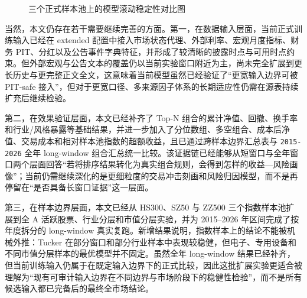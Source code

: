 \begin{figure}[htbp]
\centering
{}
\caption{三个正式样本池上的模型滚动稳定性对比图}
\label{fig:stability}
\end{figure}

当然，本文仍存在若干需要继续完善的方面。第一，在数据输入层面，当前正式训练输入已经在 extended 配置中接入市场状态代理、外部利率、宏观月度指标、财务 PIT、分红以及公告事件字典特征，并形成了较清晰的披露时点与可用时点约束。但外部宏观与公告文本的覆盖仍以当前实验窗口附近为主，尚未完全扩展到更长历史与更完整正文全文，这意味着当前模型虽然已经验证了“更宽输入边界可被 PIT-safe 接入”，但对于更宽口径、多来源因子体系的长期适应性仍需在源表持续扩充后继续检验。

第二，在效果验证层面，本文已经补齐了 Top-N 组合的累计净值、回撤、换手率和行业/风格暴露等基础结果，并进一步加入了分位数组、多空组合、成本后净值、交易成本和相对样本池指数的超额收益，且已通过跨样本边界汇总表与 \texttt{2015-2026} 全年 long-window 组合汇总统一比较。该证据链已经能够从短窗口与全年窗口两个层面回答“若将排序结果转化为真实组合规则，会得到怎样的收益—风险画像”；当前仍需继续深化的是更细粒度的交易冲击刻画和风险归因模型，而不是再停留在“是否具备长窗口证据”这一层面。

第三，在样本边界层面，本文已经从 HS300、SZ50 与 ZZ500 三个指数样本池扩展到全 A 活跃股票、行业分层和市值分层实验，并为 2015--2026 年区间完成了按年度拆分的 long-window 真实复跑。新增结果说明，指数样本上的结论不能被机械外推：Tucker 在部分窗口和部分行业样本中表现较稳健，但电子、专用设备和不同市值分层样本的最优模型并不固定。虽然全年 long-window 结果已经补齐，但当前训练输入仍属于在既定输入边界下的正式比较，因此这批扩展实验更适合被理解为“现有可审计输入边界在不同边界与市场阶段下的稳健性检验”，而不是所有候选输入都已完备后的最终全市场结论。

